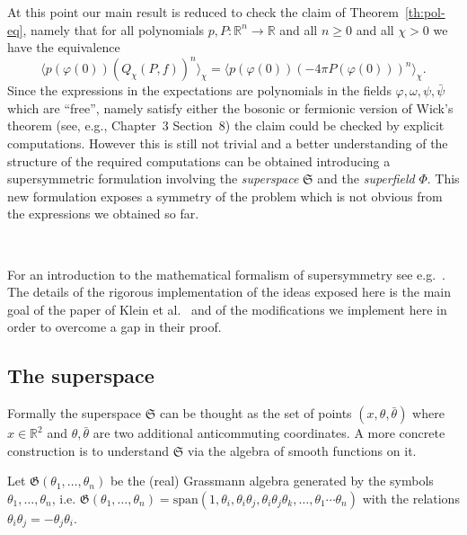 \documentclass[a4paper,10pt]{article}
\newcommand{\comma}{{,}}
\newcommand{\tmtextit}[1]{{\itshape{#1}}}
\begin{document}
At this point our main result is reduced to check the claim of
Theorem~\ref{th:pol-eq}, namely that for all polynomials $p, P : \mathbb{R}^n
\rightarrow \mathbb{R}$ and all $n \geqslant 0$ and all $\chi > 0$ we have the
equivalence
\begin{equation}
  \langle p (\varphi (0)) (Q_{\chi} (P, f))^n \rangle_{\chi} = \langle p
  (\varphi (0)) (- 4 \pi P (\varphi (0)))^n \rangle_{\chi} .
  \label{eq:pol-eq-bis}
\end{equation}
Since the expressions in the expectations are polynomials in the fields
$\varphi, \omega, \psi \comma \bar{\psi}$ which are ``free'', namely satisfy
either the bosonic or fermionic version of Wick's theorem (see, e.g.,
{\cite{Fetter2012}} Chapter~3 Section~8) the claim could be checked by
explicit computations. However this is still not trivial and a better
understanding of the structure of the required computations can be obtained
introducing a supersymmetric formulation involving the \tmtextit{superspace}
$\mathfrak{S}$ and the \tmtextit{superfield} $\Phi$. This new formulation
exposes a symmetry of the problem which is not obvious from the expressions we
obtained so far.

\

For an introduction to the mathematical formalism of supersymmetry see
e.g.~{\cite{dewitt_supermanifolds_1992,arai_supersymmetric_1993,rogers_supermanifolds_2007,de_goursac_noncommutative_2015}}.
The details of the rigorous implementation of the ideas exposed here is the
main goal of the paper of Klein et al.~{\cite{Klein1984}} and of the
modifications we implement here in order to overcome a gap in their proof.

\subsection{The superspace}

Formally the superspace $\mathfrak{S}$ can be thought as the set of points
$(x, \theta, \bar{\theta})$ where $x \in \mathbb{R}^2$ and $\theta,
\bar{\theta}$ are two additional anticommuting coordinates. A more concrete
construction is to understand $\mathfrak{S}$ via the algebra of smooth
functions on it.



Let $\mathfrak{G} (\theta_1, \ldots, \theta_n)$ be the (real) Grassmann
algebra generated by the symbols $\theta_1, \ldots, \theta_n$, i.e.
$\mathfrak{G} (\theta_1, \ldots, \theta_n) = \text{span} (1, \theta_i,
\theta_i \theta_j, \theta_i \theta_j \theta_k, \ldots, \theta_1 \cdots
\theta_n)$ with the relations $\theta_i \theta_j = - \theta_j \theta_i$.
\end{document}
